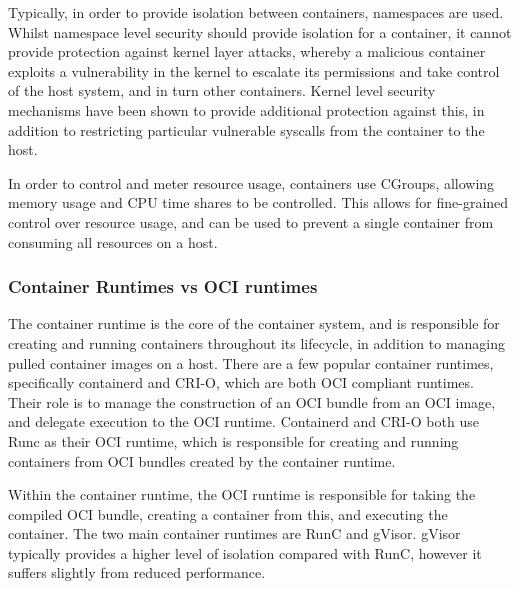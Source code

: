 Typically, in order to provide isolation between containers, namespaces are used\cite{NamespacesLinuxManual}. Whilst namespace level security should provide isolation for a container, it cannot provide protection against kernel layer attacks, whereby a malicious container exploits a vulnerability in the kernel to escalate its permissions and take control of the host system\cite{CVECVE202014386}, and in turn other containers\cite{linMeasurementStudyLinux2018}. Kernel level security mechanisms have been shown to provide additional protection against this\cite{sunSecurityNamespaceMaking2018}, in addition to restricting particular vulnerable syscalls from the container to the host\cite{GVisor}.

In order to control and meter resource usage, containers use CGroups, allowing memory usage and CPU time shares to be controlled\cite{CgroupsLinuxManual}. This allows for fine-grained control over resource usage, and can be used to prevent a single container from consuming all resources on a host\cite{ContainerSecurityFundamentals}.

\subsubsection{Container Runtimes vs OCI runtimes}
The container runtime is the core of the container system, and is responsible for creating and running containers throughout its lifecycle, in addition to managing pulled container images on a host\cite{espePerformanceEvaluationContainer2020}. There are a few popular container runtimes, specifically containerd and CRI-O, which are both OCI compliant runtimes. Their role is to manage the construction of an OCI bundle from an OCI image, and delegate execution to the OCI runtime. Containerd and CRI-O both use Runc as their OCI runtime, which is responsible for creating and running containers from OCI bundles created by the container runtime.

Within the container runtime, the OCI runtime is responsible for taking the compiled OCI bundle, creating a container from this, and executing the container. The two main container runtimes are RunC\cite{OpencontainersRunc2024} and gVisor\cite{GVisor}. gVisor typically provides a higher level of isolation compared with RunC, however it suffers slightly from reduced performance\cite{espePerformanceEvaluationContainer2020}.

